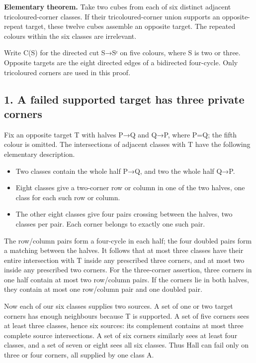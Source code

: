 \documentclass[
  10pt,
]{article}
\providecommand{\tightlist}{%
  \setlength{\itemsep}{0pt}\setlength{\parskip}{0pt}}
\begin{document}
\textbf{Elementary theorem.} Take two cubes from each of six distinct
adjacent tricoloured-corner classes. If their tricoloured-corner union
supports an opposite-repeat target, these twelve cubes assemble an
opposite target. The repeated colours within the six classes are
irrelevant.

Write C(S) for the directed cut S→Sᶜ on five colours, where
\textbar S\textbar{} is two or three. Opposite targets are the eight
directed edges of a bidirected four-cycle. Only tricoloured corners are
used in this proof.

\hypertarget{a-failed-supported-target-has-three-private-corners}{%
\subsection*{1. A failed supported target has three private
corners}\label{a-failed-supported-target-has-three-private-corners}}

Fix an opposite target T with halves P→Q and Q→P, where
\textbar P\textbar=\textbar Q; the fifth colour is omitted.
The intersections of adjacent classes with T have the following
elementary description.

\begin{itemize}
\tightlist
\item
  Two classes contain the whole half P→Q, and two the whole half Q→P.
\item
  Eight classes give a two-corner row or column in one of the two
  halves, one class for each such row or column.
\item
  The other eight classes give four pairs crossing between the halves,
  two classes per pair. Each corner belongs to exactly one such pair.
\end{itemize}

The row/column pairs form a four-cycle in each half; the four doubled
pairs form a matching between the halves. It follows that at most three
classes have their entire intersection with T inside any prescribed
three corners, and at most two inside any prescribed two corners. For
the three-corner assertion, three corners in one half contain at most
two row/column pairs. If the corners lie in both halves, they contain at
most one row/column pair and one doubled pair.

Now each of our six classes supplies two sources. A set of one or two
target corners has enough neighbours because T is supported. A set of
five corners sees at least three classes, hence six sources: its
complement contains at most three complete source intersections. A set
of six corners similarly sees at least four classes, and a set of seven
or eight sees all six classes. Thus Hall can fail only on three or four
corners, all supplied by one class A.
\end{document}
